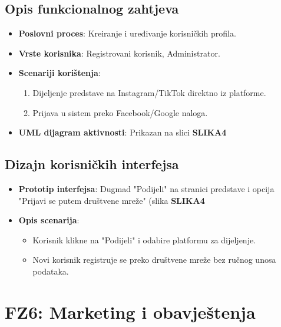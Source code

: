 \subsection{Opis funkcionalnog zahtjeva}  
\begin{itemize}  
    \item \textbf{Poslovni proces}: Kreiranje i uređivanje korisničkih profila.  
    \item \textbf{Vrste korisnika}: Registrovani korisnik, Administrator.  
    \item \textbf{Scenariji korištenja}:  
        \begin{enumerate}  
            \item Dijeljenje predstave na Instagram/TikTok direktno iz platforme.  
            \item Prijava u sistem preko Facebook/Google naloga.  
        \end{enumerate}  
    \item \textbf{UML dijagram aktivnosti}: Prikazan na slici \textbf{SLIKA4}  
\end{itemize}  

\sloppy  
\subsection{Dizajn korisničkih interfejsa}  
\begin{itemize}  
    \item \textbf{Prototip interfejsa}: Dugmad "Podijeli" na stranici predstave i opcija "Prijavi se putem društvene mreže" (slika \textbf{SLIKA4}  
    \item \textbf{Opis scenarija}:  
        \begin{itemize}  
            \item Korisnik klikne na "Podijeli" i odabire platformu za dijeljenje.  
            \item Novi korisnik registruje se preko društvene mreže bez ručnog unosa podataka.  
        \end{itemize}  
\end{itemize}  


\sloppy  
\section{FZ6: Marketing i obavještenja}  

\sloppy  
